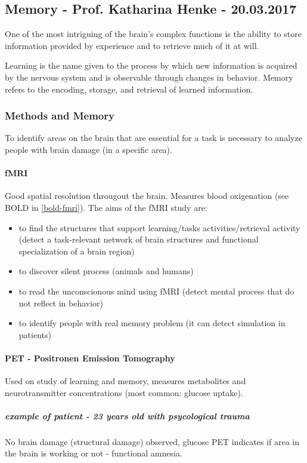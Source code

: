 \documentclass[12pt,article,oneside,a4paper]{memoir}
\begin{document}
\subsection{Memory - Prof. Katharina Henke - 20.03.2017}
One of the most intriguing of the brain's complex functions is the ability to
store information provided by experience and to retrieve much of it at will.

Learning is the name given to the process by which new information is acquired
by the nervous system and is observable through changes in behavior.
Memory refers to the encoding, storage, and retrieval of learned information. 

\subsubsection{Methods and Memory}
To identify areas on the brain that are essential for a task is necessary to
analyze people with brain damage (in a specific area).

\paragraph{fMRI}
Good spatial resolution througout the brain. Measures blood oxigenation
(see BOLD in \ref{bold-fmri}).
The aims of the fMRI study are:
\begin{itemize}
\item to find the structures that support learning/tasks activities/retrieval
activity (detect a task-relevant network of brain structures and functional
specialization of a brain region)
\item to discover silent process (animals and humans)
\item to read the unconscionous mind using fMRI (detect mental process that do
not reflect in behavior)
\item to identify people with real memory problem (it can detect simulation in
patients)
\end{itemize}

\paragraph{PET - Positronen Emission Tomography}

Used on study of learning and memory, measures metabolites and neurotransmitter
concentrations (most common: glucose uptake).
\subparagraph{example of patient - 23 years old with psycological trauma}
No brain damage (structural damage) observed, glucose PET indicates if area in
the brain is working or not - functional amnesia.
\end{document}

